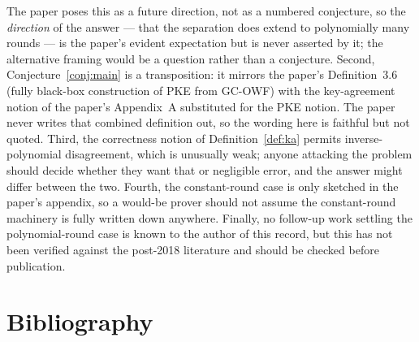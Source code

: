 \documentclass{aicr-conjecture}
\newcommand{\GCOWF}{\textup{GC-OWF}}
\begin{document}
\begin{remark}\label{rem:caveats}
The paper poses this as a future direction, not as a numbered conjecture,
so the \emph{direction} of the answer --- that the separation does extend
to polynomially many rounds --- is the paper's evident expectation but is
never asserted by it; the alternative framing would be a question rather
than a conjecture. Second, Conjecture~\ref{conj:main} is a transposition:
it mirrors the paper's Definition~3.6 (fully black-box construction of PKE
from \GCOWF{}) with the key-agreement notion of the paper's Appendix~A
substituted for the PKE notion. The paper never writes that combined
definition out, so the wording here is faithful but not quoted. Third, the
correctness notion of Definition~\ref{def:ka} permits inverse-polynomial
disagreement, which is unusually weak; anyone attacking the problem should
decide whether they want that or negligible error, and the answer might
differ between the two. Fourth, the constant-round case is only sketched
in the paper's appendix, so a would-be prover should not assume the
constant-round machinery is fully written down anywhere. Finally, no
follow-up work settling the polynomial-round case is known to the author
of this record, but this has not been verified against the post-2018
literature and should be checked before publication.
\end{remark}

\section{Bibliography}
\end{document}
